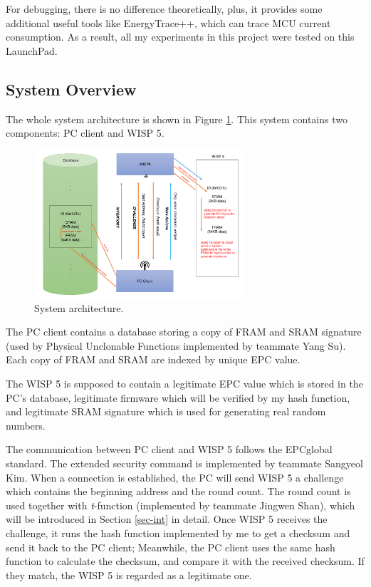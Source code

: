 \documentclass[sigconf, review=false]{acmart}
\let\OldTexttrademark\texttrademark
\renewcommand{\texttrademark}{\OldTexttrademark\xspace}%
\begin{document}
For debugging, there is no difference theoretically, plus, it provides some additional useful tools
like EnergyTrace++\texttrademark, which can trace MCU current consumption.
As a result, all my experiments in this project were tested on this LaunchPad.

\subsection{System Overview}
The whole system architecture is shown in Figure \ref{fig-arch}.
This system contains two components: PC client and WISP 5.

\begin{figure}
\centering
\includegraphics[width=0.7\textwidth]{arch.pdf}
\caption{System architecture.}
\label{fig-arch}
\end{figure}

The PC client contains a database storing a copy of FRAM and SRAM signature
(used by Physical Unclonable Functions implemented by teammate Yang Su).
Each copy of FRAM and SRAM are indexed by unique EPC value.

The WISP 5 is supposed to contain a legitimate EPC value which is stored in the PC's database,
legitimate firmware which will be verified by my hash function,
and legitimate SRAM signature which is used for generating real random numbers.

The communication between PC client and WISP 5 follows the EPCglobal standard.
The extended security command is implemented by teammate Sangyeol Kim.
When a connection is established, the PC will send WISP 5 a challenge which contains the beginning address and the round count.
The round count is used together with \textit{t}-function (implemented by teammate Jingwen Shan),
which will be introduced in Section \ref{sec-int} in detail.
Once WISP 5 receives the challenge, it runs the hash function implemented by me to get a checksum and send it back to the PC client;
Meanwhile, the PC client uses the same hash function to calculate the checksum, and compare it with the received checksum.
If they match, the WISP 5 is regarded as a legitimate one.
\end{document}
